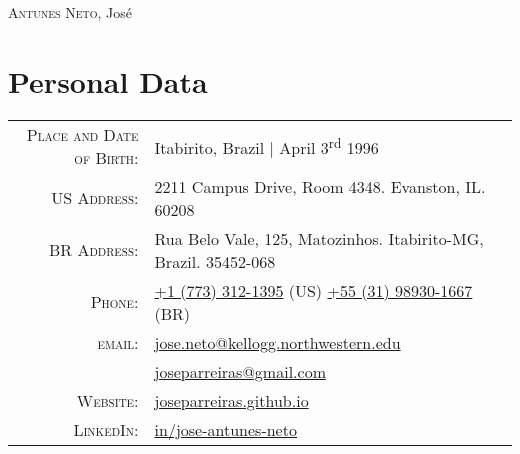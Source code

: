 \documentclass[a4paper,10pt]{article}
\begin{document}
\par{
    \centering
    {\Huge \textsc{Antunes Neto}, José
    }\bigskip\par
}

\section{Personal Data}

\begin{tabular}{rp{10.75cm}}
    \textsc{Place and Date of Birth:} & Itabirito, Brazil  | April 3\textsuperscript{rd}  1996 \\
    \textsc{US Address:}   & 2211 Campus Drive, Room 4348. Evanston, IL. 60208 \\
    \textsc{BR Address:}& Rua Belo Vale, 125, Matozinhos. Itabirito-MG, Brazil. 35452-068  \\
    \textsc{Phone:}     & \href{tel:+17733121395}{+1 (773) 312-1395} (US) \quad \href{tel:+5531989301667}{+55 (31) 98930-1667} (BR) \\
    \textsc{email:}     & \href{mailto:jose.neto@kellogg.northwestern.edu}{jose.neto@kellogg.northwestern.edu} \\
    & \href{mailto:joseparreiras@gmail.com}{joseparreiras@gmail.com} \\
    \textsc{Website:}   & \href{http://joseparreiras.github.io}{joseparreiras.github.io} \\
    \textsc{LinkedIn:}  & \href{https://www.linkedin.com/in/jose-antunes-neto/}{in/jose-antunes-neto}
\end{tabular}

\end{document}
